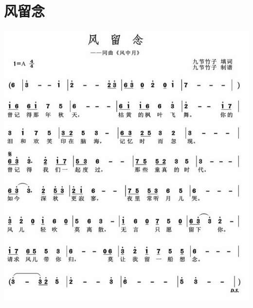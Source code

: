 \documentclass[cn,pad,chinese,chinesefont=nofont]{elegantbook}
\begin{document}
\section{风留念}
    \includegraphics[width=\textwidth]{dongxiao/20200323风留念.jpg}
\end{document}
